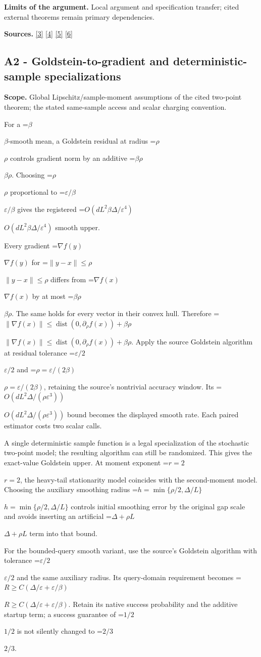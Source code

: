 \documentclass[10pt,a4paper]{article}
\newcommand{\AtlasMath}[1]{\par\begingroup\centering\setbox0=\hbox{$\displaystyle #1$}\ifdim\wd0>1.4\linewidth\typeout{ATLAS WIDE FORMULA: \the\wd0}\fi\ifdim\wd0>\linewidth\resizebox{\linewidth}{!}{\box0}\else\box0\fi\par\endgroup}
\newcommand{\AtlasInlineMath}[1]{\begingroup\setbox0=\hbox{$#1$}\ifdim\wd0>.4\linewidth\endgroup\AtlasMath{#1}\else\endgroup$#1$\fi}
\begin{document}
\textbf{Limits of the argument.} Local argument and specification transfer; cited external theorems remain primary dependencies.

\textbf{Sources.} \href{https://arxiv.org/html/2610.19652v1}{[3]} \href{https://arxiv.org/html/2609.00045v3}{[4]} \href{https://arxiv.org/pdf/2610.00245v2}{[5]} \href{https://arxiv.org/html/2610.17074v1}{[6]}

\subsection{A2 - Goldstein-to-gradient and deterministic-sample specializations}
\textbf{Scope.} Global Lipschitz/sample-moment assumptions of the cited two-point theorem; the stated same-sample access and scalar charging convention.

For a \AtlasInlineMath{\beta}-smooth mean, a Goldstein residual at radius \AtlasInlineMath{\rho} controls gradient norm by an additive \AtlasInlineMath{\beta\rho}. Choosing \AtlasInlineMath{\rho} proportional to \AtlasInlineMath{\varepsilon/\beta} gives the registered \AtlasInlineMath{O(dL^2\beta\Delta/\varepsilon^4)} smooth upper.

Every gradient \AtlasInlineMath{\nabla f(y)} for \AtlasInlineMath{\|y-x\|\le\rho} differs from \AtlasInlineMath{\nabla f(x)} by at most \AtlasInlineMath{\beta\rho}. The same holds for every vector in their convex hull. Therefore \AtlasInlineMath{\|\nabla f(x)\|\le\operatorname{dist}(0,\partial_\rho f(x))+\beta\rho}. Apply the source Goldstein algorithm at residual tolerance \AtlasInlineMath{\varepsilon/2} and \AtlasInlineMath{\rho=\varepsilon/(2\beta)}, retaining the source's nontrivial accuracy window. Its \AtlasInlineMath{O(dL^2\Delta/(\rho\varepsilon^3))} bound becomes the displayed smooth rate. Each paired estimator costs two scalar calls.

A single deterministic sample function is a legal specialization of the stochastic two-point model; the resulting algorithm can still be randomized. This gives the exact-value Goldstein upper. At moment exponent \AtlasInlineMath{r=2}, the heavy-tail stationarity model coincides with the second-moment model. Choosing the auxiliary smoothing radius \AtlasInlineMath{h=\min\{\rho/2,\Delta/L\}} controls initial smoothing error by the original gap scale and avoids inserting an artificial \AtlasInlineMath{\Delta+\rho L} term into that bound.

For the bounded-query smooth variant, use the source's Goldstein algorithm with tolerance \AtlasInlineMath{\varepsilon/2} and the same auxiliary radius. Its query-domain requirement becomes \AtlasInlineMath{R\ge C(\Delta/\varepsilon+\varepsilon/\beta)}. Retain its native success probability and the additive startup term; a success guarantee of \AtlasInlineMath{1/2} is not silently changed to \AtlasInlineMath{2/3}.
\end{document}
